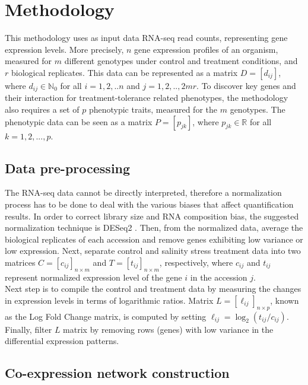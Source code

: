 \documentclass[12pt,journal, onecolumn]{IEEEtran}
\begin{document}
\section{Methodology}

This methodology uses as input data RNA-seq read counts, representing gene expression levels. More precisely, $n$ gene expression profiles of an organism, measured for $m$ different genotypes under control and treatment conditions, and $r$ biological replicates. This data can be represented as a matrix $D=[d_{ij}]$, where $d_{ij} \in \mathbb{N}_0$ for all $i = 1,2,..n$ and $j=1,2,..,2mr$. To discover key genes and their interaction for treatment-tolerance related phenotypes, the methodology also requires a set of $p$ phenotypic traits, measured for the $m$ genotypes. The phenotypic data can be seen as a matrix $P=[p_{jk}]$, where $p_{jk} \in \mathbb{R}$ for all $k = 1,2,...,p$. 

\subsection{Data pre-processing}

The RNA-seq data cannot be directly interpreted, therefore a normalization process has to be done to deal with the various biases that affect quantification results. In order to correct library size and RNA composition bias, the suggested normalization technique is DESeq2 \cite{love2014moderated}. Then, from the normalized data, average the biological replicates of each accession and remove genes exhibiting low variance or low expression. Next, separate control and salinity stress treatment data into two matrices $C=[c_{ij}]_{n \times m}$ and $T=[t_{ij}]_{n \times m}$, respectively, where $c_{ij}$ and $t_{ij}$ represent normalized expression level of the gene $i$ in the accession $j$.\\

Next step is to compile the control and treatment data by measuring the changes in expression levels in terms of logarithmic ratios. Matrix $L=[\ell_{ij}]_{n \times p}$, known as the Log Fold Change matrix, is computed by setting $\ell_{ij}=\log_2 (t_{ij}/c_{ij})$. Finally, filter $L$ matrix by removing rows (genes) with low variance in the differential expression patterns.


\subsection{Co-expression network construction}
\end{document}
